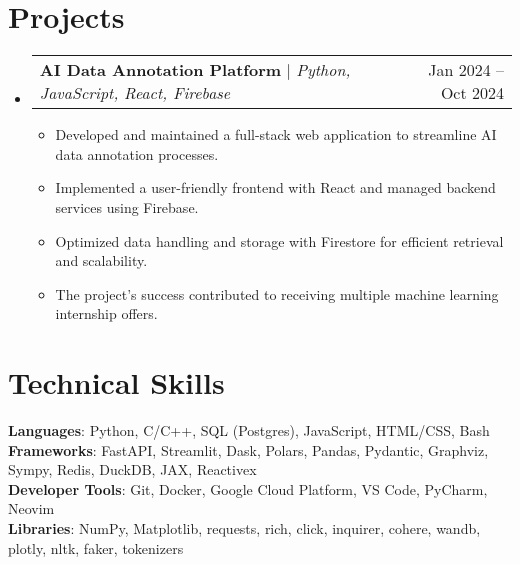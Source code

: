 \documentclass[letterpaper,11pt]{article}
\makeatletter
\newcommand{\resumeItem}[1]{
  \item\small{
    {#1 \vspace{-2pt}}
  }
}
\newcommand{\resumeProjectHeading}[2]{
    \item
    \begin{tabular*}{0.97\textwidth}{l@{\extracolsep{\fill}}r}
      \small#1 & #2 \\
    \end{tabular*}\vspace{-7pt}
}
\newcommand{\resumeSubHeadingListStart}{\begin{itemize}[leftmargin=0.15in, label={}]}
\newcommand{\resumeSubHeadingListEnd}{\end{itemize}}
\newcommand{\resumeItemListStart}{\begin{itemize}}
\newcommand{\resumeItemListEnd}{\end{itemize}\vspace{-5pt}}
\makeatother
\begin{document}
\section{Projects}
    \resumeSubHeadingListStart
      \resumeProjectHeading
          {\textbf{AI Data Annotation Platform} $|$ \emph{Python, JavaScript, React, Firebase}}{Jan 2024 -- Oct 2024}
          \resumeItemListStart
            \resumeItem{Developed and maintained a full-stack web application to streamline AI data annotation processes.}
            \resumeItem{Implemented a user-friendly frontend with React and managed backend services using Firebase.}
            \resumeItem{Optimized data handling and storage with Firestore for efficient retrieval and scalability.}
            \resumeItem{The project's success contributed to receiving multiple machine learning internship offers.}
          \resumeItemListEnd
    \resumeSubHeadingListEnd




%
\section{Technical Skills}
 \begin{itemize}[leftmargin=0.15in, label={}]
    \small{\item{
     \textbf{Languages}{: Python, C/C++, SQL (Postgres), JavaScript, HTML/CSS, Bash} \\
     \textbf{Frameworks}{: FastAPI, Streamlit, Dask, Polars, Pandas, Pydantic, Graphviz, Sympy, Redis, DuckDB, JAX, Reactivex} \\
     \textbf{Developer Tools}{: Git, Docker, Google Cloud Platform, VS Code, PyCharm, Neovim} \\
     \textbf{Libraries}{: NumPy, Matplotlib, requests, rich, click, inquirer, cohere, wandb, plotly, nltk, faker, tokenizers}
    }}
 \end{itemize}


\end{document}

